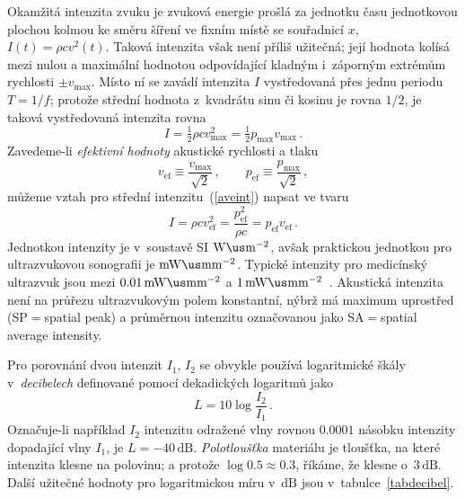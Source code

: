 Okamžitá intenzita zvuku je zvuková energie prošlá za jednotku času
jednotkovou plochou kolmou ke směru šíření ve fixním místě se souřadnicí $x$,
$I(t) = \rho c v^{2}(t)$.  Taková intenzita však není příliš užitečná; její
hodnota kolísá mezi nulou a maximální hodnotou odpovídající kladným i~záporným
extrémům rychlosti $\pm v_{\mathrm{max}}$. Místo ní se zavádí intenzita $I$
vystředovaná přes jednu periodu $T=1/f$; protože střední hodnota z~kvadrátu
sinu či kosinu je rovna $1/2$, je taková vystředovaná intenzita rovna
\begin{equation}
  I = \tfrac{1}{2} \rho c v_{\mathrm{max}}^{2}
    = \tfrac{1}{2} p_{\mathrm{max}} v_{\mathrm{max}}\,.      \label{aveint}
\end{equation}
Zavedeme-li \emph{efektivní hodnoty} akustické rychlosti a tlaku
\begin{equation}
  v_{\mathrm{ef}} \equiv \frac{v_{\mathrm{max}}}{\sqrt{2}}\,,\qquad
  p_{\mathrm{ef}} \equiv \frac{p_{\mathrm{max}}}{\sqrt{2}}\,,\label{efaccu}
\end{equation}
můžeme vztah pro střední intenzitu~(\ref{aveint}) napsat ve tvaru
\begin{equation}
    I = \rho c v_{\mathrm{ef}}^{2}
      = \frac{p_{\mathrm{ef}}^{2}}{\rho c}
      = p_{\mathrm{ef}} v_{\mathrm{ef}}\,.                  \label{accuint}
\end{equation}
Jednotkou intenzity je v~soustavě SI $\mathrm{W\us m^{-2}}$, avšak praktickou
jednotkou pro ultrazvukovou sonografii je $\mathrm{mW\us mm^{-2}}$. Typické
intenzity pro medicínský ultrazvuk jsou mezi $0.01\,\mathrm{mW\us mm^{-2}}$ a
$1\,\mathrm{mW\us mm^{-2}}$~\cite{Dow-Ken-Joh:2006:PhysDiagImag:}. Akustická
intenzita není na průřezu ultrazvukovým polem konstantní, nýbrž má maximum
uprostřed (SP${}={}$spatial peak) a průměrnou intenzitu označovanou jako
SA${}={}$spatial average intensity.

Pro porovnání dvou intenzit $I_{1}$, $I_{2}$ se obvykle používá logaritmické
škály v~\emph{decibelech} definované pomocí dekadických logaritmů jako
\begin{equation}
  L = 10\log\frac{I_{2}}{I_{1}}\,.                          \label{decibel}
\end{equation}
Označuje-li například $I_{2}$ intenzitu odražené vlny rovnou $0.0001$ násobku
intenzity dopadající vlny $I_{1}$, je $L=-40\,\mathrm{dB}$.
\emph{Polotloušťka} materiálu je tloušťka, na které intenzita klesne na
polovinu; a protože $\log0.5\approx0.3$, říkáme, že klesne
o~$3\,\mathrm{dB}$. Další užitečné hodnoty pro logaritmickou míru
v~$\mathrm{dB}$ jsou v~tabulce~\ref{tabdecibel}.

